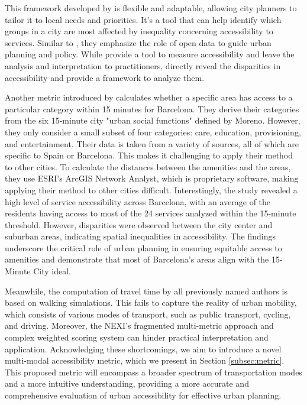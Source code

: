 This framework developed by  is flexible and adaptable, allowing city planners to tailor it to local needs and priorities. 
It's a tool that can help identify which groups in a city are most affected by inequality concerning accessibility to services. 
Similar to , they emphasize the role of open data to guide urban planning and policy.
While  provide a tool to measure accessibility and leave the analysis and interpretation to practitioners,  directly reveal the disparities in accessibility and provide a framework to analyze them.

Another metric introduced by  calculates whether a specific area has access to a particular category within 15 minutes for Barcelona.
They derive their categories from the six 15-minute city "urban social functions" defined by Moreno.
However, they only consider a small subset of four categories: care, education, provisioning, and entertainment.
Their data is taken from a variety of sources, all of which are specific to Spain or Barcelona.
This makes it challenging to apply their method to other cities.
To calculate the distances between the amenities and the areas, they use ESRI's ArcGIS Network Analyst, which is proprietary software, making applying their method to other cities difficult.
Interestingly, the study revealed a high level of service accessibility across Barcelona, with an average of the residents having access to most of the 24 services analyzed within the 15-minute threshold. 
However, disparities were observed between the city center and suburban areas, indicating spatial inequalities in accessibility.
The findings underscore the critical role of urban planning in ensuring equitable access to amenities and demonstrate that most of Barcelona's areas align with the 15-Minute City ideal. 

Meanwhile, the computation of travel time by all previously named authors is based on walking simulations. 
This fails to capture the reality of urban mobility, which consists of various modes of transport, such as public transport, cycling, and driving.
Moreover, the NEXI's fragmented multi-metric approach and complex weighted scoring system can hinder practical interpretation and application.
Acknowledging these shortcomings, we aim to introduce a novel multi-modal accessibility metric, which we present in Section \ref{subsec:metric}.
This proposed metric will encompass a broader spectrum of transportation modes and a more intuitive understanding, providing a more accurate and comprehensive evaluation of urban accessibility for effective urban planning.

